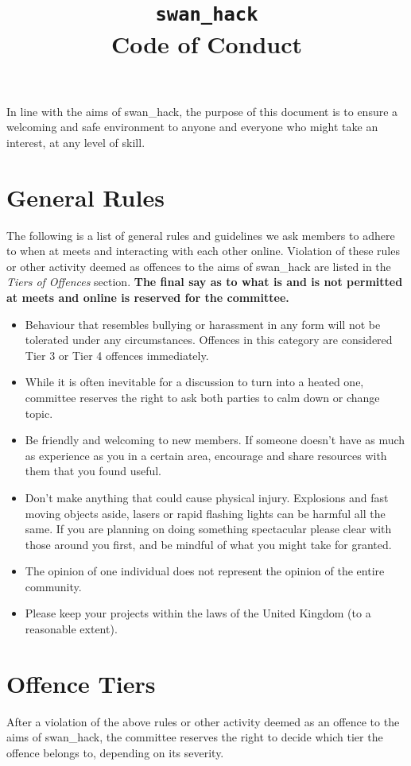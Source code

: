 \documentclass[12pt]{extarticle}
\title{\vspace{-2cm}\texttt{swan\_hack} \\ {Code of Conduct}\vspace{-1cm}}
\date{}
\begin{document}
	\maketitle
	In line with the aims of swan\_hack, the purpose of this document is to ensure a welcoming and safe environment to anyone and everyone who might take an interest, at any level of skill. 
	
	\section*{General Rules}
	The following is a list of general rules and guidelines we ask members to adhere to when at meets and interacting with each other online. Violation of these rules or other activity deemed as offences to the aims of swan\_hack are listed in the \emph{Tiers of Offences} section.
    \textbf{The final say as to what is and is not permitted at meets and online is reserved for the committee.}
    
	\begin{itemize}
		\item Behaviour that resembles bullying or harassment in any form will not be tolerated under any circumstances. Offences in this category are considered Tier 3 or Tier 4 offences immediately.
		\item While it is often inevitable for a discussion to turn into a heated one, committee reserves the right to ask both parties to calm down or change topic.
		\item Be friendly and welcoming to new members. If someone doesn't have as much as experience as you in a certain area, encourage and share resources with them that you found useful.
		\item Don't make anything that could cause physical injury. Explosions and fast moving objects aside, lasers or rapid flashing lights can be harmful all the same. If you are planning on doing something spectacular please clear with those around you first, and be mindful of what you might take for granted.
		\item The opinion of one individual does not represent the opinion of the entire community.
		\item Please keep your projects within the laws of the United Kingdom (to a reasonable extent).
	\end{itemize}   
	
	\section*{Offence Tiers}
	After a violation of the above rules or other activity deemed as an offence to the aims of swan\_hack, the committee reserves the right to decide which tier the offence belongs to, depending on its severity. 
	
\end{document}

